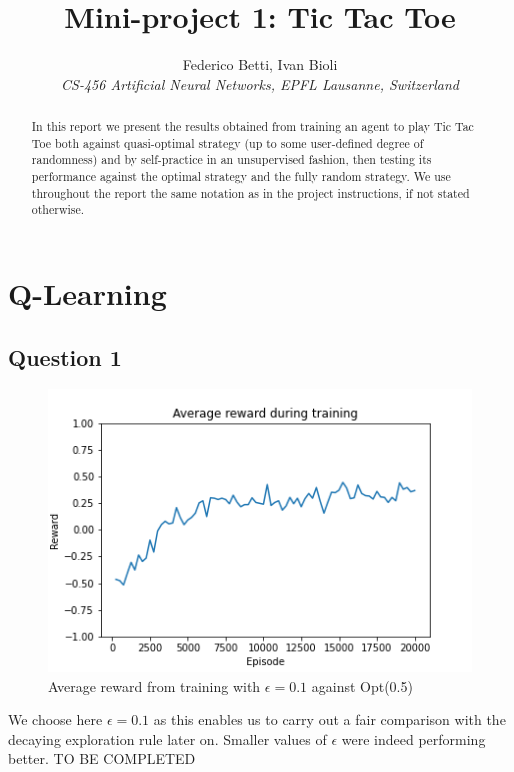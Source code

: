 \documentclass[10pt]{IEEEtran}
\begin{document}
\title{Mini-project 1: Tic Tac Toe}

\author{
   Federico Betti, Ivan Bioli\\
  \textit{CS-456 Artificial Neural Networks, EPFL Lausanne, Switzerland}
}


\maketitle


\begin{abstract}
In this report we present the results obtained from training an agent to play Tic Tac Toe both against quasi-optimal strategy (up to some user-defined degree of randomness) and by self-practice in an unsupervised fashion, then testing its performance against the optimal strategy and the fully random strategy. We use throughout the report the same notation as in the project instructions, if not stated otherwise. 
\end{abstract}
\section{Q-Learning}
\subsection*{Question 1}
\begin{figure}[H]
    \centering
    \includegraphics[scale=0.4]{code/figures/rewards_Q1.png}
    \caption{Average reward from training with $\epsilon = 0.1$ against Opt(0.5)}
    \label{plot_question1}
\end{figure}
We choose here $\epsilon = 0.1$ as this enables us to carry out a fair comparison with the decaying exploration rule later on. Smaller values of $\epsilon$ were indeed performing better. TO BE COMPLETED
\end{document}

